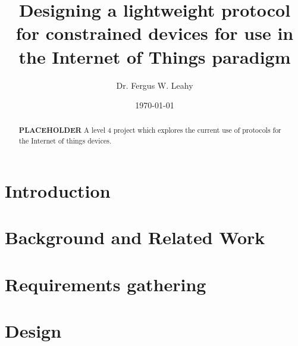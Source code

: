 \documentclass{l4proj}
\begin{document}
\title{Designing a lightweight protocol for constrained devices for use in the Internet of Things paradigm}
\author{Dr. Fergus W. Leahy}
\date{\today}
\maketitle

\begin{abstract}
\textbf{PLACEHOLDER}
A level 4 project which explores the current use of protocols for the Internet of things devices.
\end{abstract}

\educationalconsent
%
%
\tableofcontents

\chapter{Introduction}

\chapter{Background and Related Work} %
\label{cha:background}




\chapter{Requirements gathering} %
\label{cha:requirments_gathering}






\chapter{Design} %
\label{cha:design}

\end{document}
